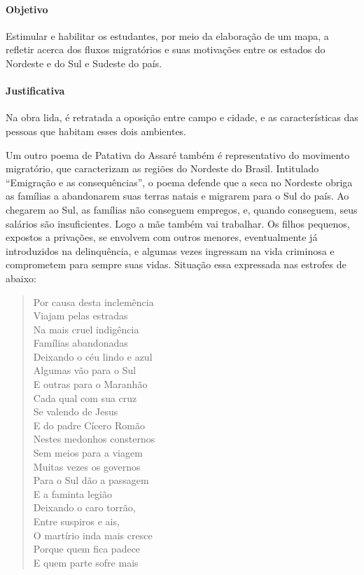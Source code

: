 \documentclass[12pt]{extarticle}
\begin{document}
\paragraph{Objetivo} Estimular e habilitar os estudantes, por meio da elaboração de um mapa, 
a refletir acerca dos fluxos migratórios e suas motivações entre os estados do Nordeste e do Sul 
e Sudeste do país. 

\paragraph{Justificativa} Na obra lida, é retratada a oposição entre campo e cidade, e as
características das pessoas que habitam esses dois ambientes.

Um outro poema de Patativa do Assaré também é representativo do movimento migratório, que 
caracterizam as regiões do Nordeste do Brasil. Intitulado ``Emigração e as consequências'', 
o poema defende que a seca no Nordeste obriga as famílias a abandonarem suas terras natais e 
migrarem para o Sul do país. Ao chegarem ao Sul, as famílias não conseguem empregos, e, quando 
conseguem, seus salários são insuficientes. Logo a mãe também vai trabalhar. Os filhos pequenos, 
expostos a privações, se envolvem com outros menores, eventualmente já introduzidos na delinquência, 
e algumas vezes ingressam na vida criminosa e comprometem para sempre suas vidas. Situação essa expressada 
nas estrofes de abaixo:

\begin{verse}
Por causa desta inclemência\\
Viajam pelas estradas\\
Na mais cruel indigência\\
Famílias abandonadas\\
Deixando o céu lindo e azul\\
Algumas vão para o Sul\\
E outras para o Maranhão\\
Cada qual com sua cruz\\
Se valendo de Jesus\\
E do padre Cícero Romão\\

Nestes medonhos consternos\\
Sem meios para a viagem\\
Muitas vezes os governos\\
Para o Sul dão a passagem\\
E a faminta legião\\
Deixando o caro torrão,\\
Entre suspiros e ais,\\
O martírio inda mais cresce\\
Porque quem fica padece\\
E quem parte sofre mais\\
\end{verse}
\end{document}

